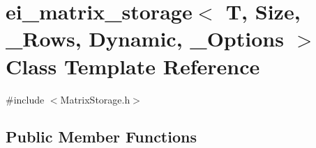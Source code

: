 \hypertarget{classei__matrix__storage_3_01_t_00_01_size_00_01___rows_00_01_dynamic_00_01___options_01_4}{\section{ei\-\_\-matrix\-\_\-storage$<$ T, Size, \-\_\-\-Rows, Dynamic, \-\_\-\-Options $>$ Class Template Reference}
\label{classei__matrix__storage_3_01_t_00_01_size_00_01___rows_00_01_dynamic_00_01___options_01_4}
}


{\ttfamily \#include $<$Matrix\-Storage.\-h$>$}

\subsection*{Public Member Functions}
